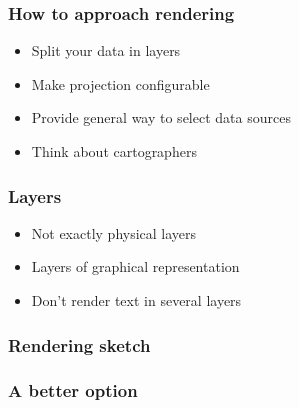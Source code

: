 \documentclass[14pt]{beamer}
\begin{document}
\begin{frame}
  \frametitle{How to approach rendering}
  \begin{itemize}
  \item Split your data in layers
  \item Make projection configurable
  \item Provide general way to select data sources
  \item Think about cartographers
  \end{itemize}
\end{frame}

\begin{frame}
  \frametitle{Layers}
  \begin{itemize}
  \item Not exactly physical layers
  \item Layers of graphical representation
  \item Don't render text in several layers
  \end{itemize}
\end{frame}

\begin{frame}
  \frametitle{Rendering sketch}
\end{frame}


\begin{frame}
  \frametitle{A better option}
\end{frame}
\end{document}
